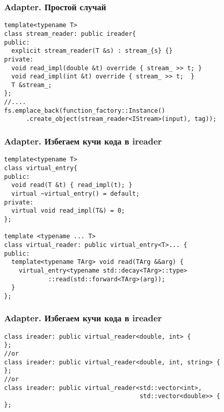 \begin{frame}[fragile]
  \frametitle{Adapter. Простой случай}
  \begin{verbatim}
template<typename T>
class stream_reader: public ireader{
public:
  explicit stream_reader(T &s) : stream_{s} {}
private:
  void read_impl(double &t) override { stream_ >> t; }
  void read_impl(int &t) override { stream_ >> t;  }
  T &stream_;
};
//....
fs.emplace_back(function_factory::Instance()
      .create_object(stream_reader<IStream>(input), tag));
  \end{verbatim}
\end{frame}

\begin{frame}[fragile]
  \frametitle{Adapter. Избегаем кучи кода в ireader}
  \begin{verbatim}
template<typename T>
class virtual_entry{
public:
  void read(T &t) { read_impl(t); }
  virtual ~virtual_entry() = default;
private:
  virtual void read_impl(T&) = 0;
};

template <typename ... T>
class virtual_reader: public virtual_entry<T>... {
public:
  template<typename TArg> void read(TArg &&arg) { 
    virtual_entry<typename std::decay<TArg>::type>
            ::read(std::forward<TArg>(arg)); 
  }
};
  \end{verbatim}
\end{frame}

\begin{frame}[fragile]
  \frametitle{Adapter. Избегаем кучи кода в ireader}
  \begin{verbatim}
class ireader: public virtual_reader<double, int> {
};
//or
class ireader: public virtual_reader<double, int, string> {
};
//or
class ireader: public virtual_reader<std::vector<int>, 
                                     std::vector<double>> {
};
  \end{verbatim}
\end{frame}

